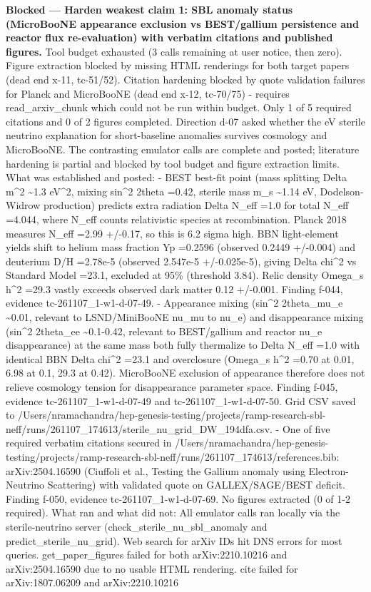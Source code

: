 \documentclass[11pt,a4paper]{article}
\begin{document}
\textbf{Blocked --- Harden weakest claim 1: SBL anomaly status (MicroBooNE appearance exclusion vs BEST/gallium persistence and reactor flux re-evaluation) with verbatim citations and published figures.} Tool budget exhausted (3 calls remaining at user notice, then zero). Figure extraction blocked by missing HTML renderings for both target papers (dead end x-11, tc-51/52). Citation hardening blocked by quote validation failures for Planck and MicroBooNE (dead end x-12, tc-70/75) - requires read\_arxiv\_chunk which could not be run within budget. Only 1 of 5 required citations and 0 of 2 figures completed. Direction d-07 asked whether the eV sterile neutrino explanation for short-baseline anomalies survives cosmology and MicroBooNE. The contrasting emulator calls are complete and posted; literature hardening is partial and blocked by tool budget and figure extraction limits. What was established and posted: - BEST best-fit point (mass splitting Delta m\textasciicircum{}2 \textasciitilde{}1.3 eV\textasciicircum{}2, mixing sin\textasciicircum{}2 2theta =0.42, sterile mass m\_s \textasciitilde{}1.14 eV, Dodelson-Widrow production) predicts extra radiation Delta N\_eff =1.0 for total N\_eff =4.044, where N\_eff counts relativistic species at recombination. Planck 2018 measures N\_eff =2.99 +/-0.17, so this is 6.2 sigma high. BBN light-element yields shift to helium mass fraction Yp =0.2596 (observed 0.2449 +/-0.004) and deuterium D/H =2.78e-5 (observed 2.547e-5 +/-0.025e-5), giving Delta chi\textasciicircum{}2 vs Standard Model =23.1, excluded at 95\% (threshold 3.84). Relic density Omega\_s h\textasciicircum{}2 =29.3 vastly exceeds observed dark matter 0.12 +/-0.001. Finding f-044, evidence tc-261107\_1-w1-d-07-49. - Appearance mixing (sin\textasciicircum{}2 2theta\_mu\_e \textasciitilde{}0.01, relevant to LSND/MiniBooNE nu\_mu to nu\_e) and disappearance mixing (sin\textasciicircum{}2 2theta\_ee \textasciitilde{}0.1-0.42, relevant to BEST/gallium and reactor nu\_e disappearance) at the same mass both fully thermalize to Delta N\_eff =1.0 with identical BBN Delta chi\textasciicircum{}2 =23.1 and overclosure (Omega\_s h\textasciicircum{}2 =0.70 at 0.01, 6.98 at 0.1, 29.3 at 0.42). MicroBooNE exclusion of appearance therefore does not relieve cosmology tension for disappearance parameter space. Finding f-045, evidence tc-261107\_1-w1-d-07-49 and tc-261107\_1-w1-d-07-50. Grid CSV saved to /Users/nramachandra/hep-genesis-testing/projects/ramp-research-sbl-neff/runs/261107\_174613/sterile\_nu\_grid\_DW\_194dfa.csv. - One of five required verbatim citations secured in /Users/nramachandra/hep-genesis-testing/projects/ramp-research-sbl-neff/runs/261107\_174613/references.bib: arXiv:2504.16590 (Ciuffoli et al., Testing the Gallium anomaly using Electron-Neutrino Scattering) with validated quote on GALLEX/SAGE/BEST deficit. Finding f-050, evidence tc-261107\_1-w1-d-07-69. No figures extracted (0 of 1-2 required). What ran and what did not: All emulator calls ran locally via the sterile-neutrino server (check\_sterile\_nu\_sbl\_anomaly and predict\_sterile\_nu\_grid). Web search for arXiv IDs hit DNS errors for most queries. get\_paper\_figures failed for both arXiv:2210.10216 and arXiv:2504.16590 due to no usable HTML rendering. cite failed for arXiv:1807.06209 and arXiv:2210.10216 
\end{document}
